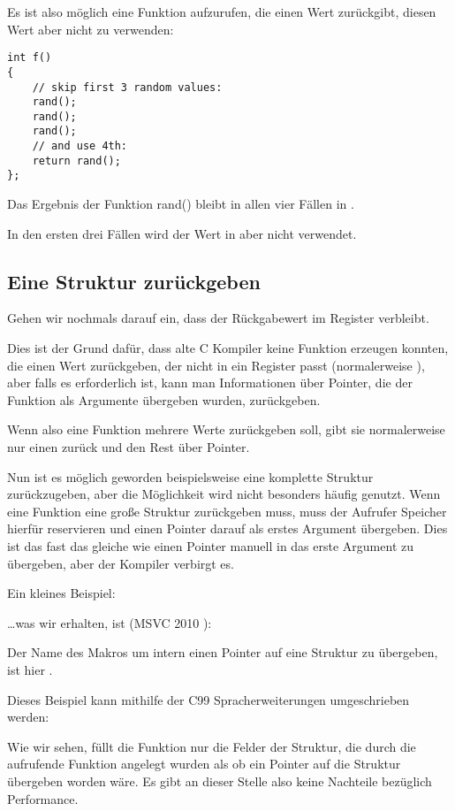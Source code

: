Es ist also möglich eine Funktion aufzurufen, die einen Wert zurückgibt, diesen Wert aber nicht zu verwenden:


\begin{lstlisting}[style=customc]
int f()
{
    // skip first 3 random values:
    rand();
    rand();
    rand();
    // and use 4th:
    return rand();
};
\end{lstlisting}
Das Ergebnis der Funktion rand() bleibt in allen vier Fällen in \EAX.

In den ersten drei Fällen wird der Wert in \EAX aber nicht verwendet.

\subsection{Eine Struktur zurückgeben}

Gehen wir nochmals darauf ein, dass der Rückgabewert im \EAX Register verbleibt.

Dies ist der Grund dafür, dass alte C Kompiler keine Funktion erzeugen konnten, die einen Wert zurückgeben, der nicht in
ein Register passt (normalerweise \Tint), aber falls es erforderlich ist, kann man Informationen über Pointer, die der
Funktion als Argumente übergeben wurden, zurückgeben.

Wenn also eine Funktion mehrere Werte zurückgeben soll, gibt sie normalerweise nur einen zurück und den Rest über
Pointer.

Nun ist es möglich geworden beispielsweise eine komplette Struktur zurückzugeben, aber die Möglichkeit wird nicht
besonders häufig genutzt. Wenn eine Funktion eine große Struktur zurückgeben muss, muss der Aufrufer Speicher hierfür
reservieren und einen Pointer darauf als erstes Argument übergeben.
Dies ist das fast das gleiche wie einen Pointer manuell in das erste Argument zu übergeben, aber der Kompiler verbirgt
es.

Ein kleines Beispiel:



\dots was wir erhalten, ist (MSVC 2010 \Ox):



Der Name des Makros um intern einen Pointer auf eine Struktur zu übergeben, ist hier .

Dieses Beispiel kann mithilfe der C99 Spracherweiterungen umgeschrieben werden:




Wie wir sehen, füllt die Funktion nur die Felder der Struktur, die durch die aufrufende Funktion angelegt wurden als ob
ein Pointer auf die Struktur übergeben worden wäre. Es gibt an dieser Stelle also keine Nachteile bezüglich Performance.

